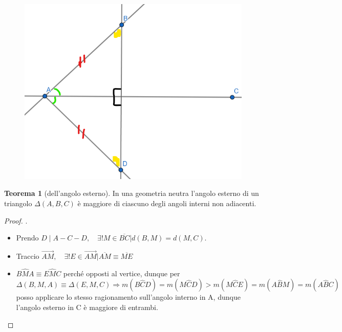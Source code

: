 \documentclass[a4paper,10pt]{article}
\theoremstyle{definition}
\theoremstyle{indentdefinition}
\theoremstyle{indentpostulate}
\theoremstyle{indenttheorem}
\newtheorem{thm}{Teorema}[section]
\theoremstyle{myremark}
\theoremstyle{indentgeneral}
\newenvironment{myboxed} 
{\noindent\begin{lrbox}{\mybox}\begin{minipage}{\textwidth}}
{\end{minipage}\end{lrbox}\fbox{\usebox{\mybox}}}
\begin{document}
\begin{figure}[H]
    \centering
    \includegraphics[scale=0.15]{Perp.png}

\end{figure}

\begin{myboxed}
\begin{thm}[dell'angolo esterno]\label{thm-angolo-esterno} In una geometria neutra l'angolo esterno di un triangolo $\Delta (A,B,C)$ è maggiore di ciascuno degli angoli interni non adiacenti.    
\end{thm}
\end{myboxed}

\begin{proof}  .
\begin{itemize}
    \item Prendo $D\mid A-C-D,\quad  \exists ! M \in \overline{BC}|d(B,M)=d(M,C).$ 
    \item Traccio $\overrightarrow{AM}, \quad \exists ! E \in \overrightarrow{AM}| \overline{AM} \equiv \overline{ME}$
    \item $B\hat{M}A \equiv E \hat{M} C$ perché opposti al vertice, dunque per  $$\Delta (B,M,A) \equiv \Delta (E, M, C) \Rightarrow m(B\hat{C}D)=m(M\hat{C}D)>m(M\hat{C}E)=m(A\hat{B}M)=m(A \hat{B}C)$$
    posso applicare lo stesso ragionamento sull'angolo interno in A, dunque l'angolo esterno in C è maggiore di entrambi.
\end{itemize}    \end{proof} 
\end{document}
